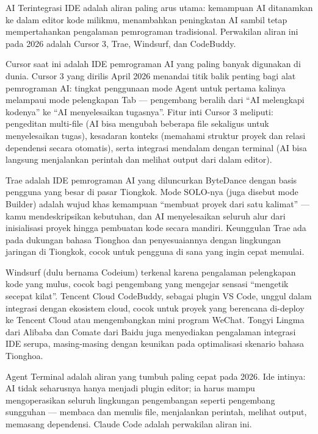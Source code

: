 
AI Terintegrasi IDE adalah aliran paling arus utama: kemampuan AI ditanamkan ke dalam editor kode milikmu, menambahkan peningkatan AI sambil tetap mempertahankan pengalaman pemrograman tradisional. Perwakilan aliran ini pada 2026 adalah Cursor 3, Trae, Windsurf, dan CodeBuddy.


Cursor saat ini adalah IDE pemrograman AI yang paling banyak digunakan di dunia. Cursor 3 yang dirilis April 2026 menandai titik balik penting bagi alat pemrograman AI: tingkat penggunaan mode Agent untuk pertama kalinya melampaui mode pelengkapan Tab — pengembang beralih dari “AI melengkapi kodenya” ke “AI menyelesaikan tugasnya”. Fitur inti Cursor 3 meliputi: pengeditan multi-file (AI bisa mengubah beberapa file sekaligus untuk menyelesaikan tugas), kesadaran konteks (memahami struktur proyek dan relasi dependensi secara otomatis), serta integrasi mendalam dengan terminal (AI bisa langsung menjalankan perintah dan melihat output dari dalam editor).


Trae adalah IDE pemrograman AI yang diluncurkan ByteDance dengan basis pengguna yang besar di pasar Tiongkok. Mode SOLO-nya (juga disebut mode Builder) adalah wujud khas kemampuan “membuat proyek dari satu kalimat” — kamu mendeskripsikan kebutuhan, dan AI menyelesaikan seluruh alur dari inisialisasi proyek hingga pembuatan kode secara mandiri. Keunggulan Trae ada pada dukungan bahasa Tionghoa dan penyesuaiannya dengan lingkungan jaringan di Tiongkok, cocok untuk pengguna di sana yang ingin cepat memulai.


Windsurf (dulu bernama Codeium) terkenal karena pengalaman pelengkapan kode yang mulus, cocok bagi pengembang yang mengejar sensasi “mengetik secepat kilat”. Tencent Cloud CodeBuddy, sebagai plugin VS Code, unggul dalam integrasi dengan ekosistem cloud, cocok untuk proyek yang berencana di-deploy ke Tencent Cloud atau mengembangkan mini program WeChat. Tongyi Lingma dari Alibaba dan Comate dari Baidu juga menyediakan pengalaman integrasi IDE serupa, masing-masing dengan keunikan pada optimalisasi skenario bahasa Tionghoa.


Agent Terminal adalah aliran yang tumbuh paling cepat pada 2026. Ide intinya: AI tidak seharusnya hanya menjadi plugin editor; ia harus mampu mengoperasikan seluruh lingkungan pengembangan seperti pengembang sungguhan — membaca dan menulis file, menjalankan perintah, melihat output, memasang dependensi. Claude Code adalah perwakilan aliran ini.


